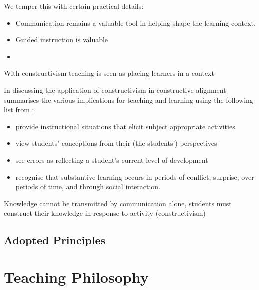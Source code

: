 We temper this with certain practical details:
\begin{itemize}
	\item Communication remains a valuable tool in helping shape the learning context. 
	\item Guided instruction is valuable
	\item 
\end{itemize}


With constructivism teaching is seen as placing learners in a context 







In discussing the application of constructivism in constructive alignment \citet{Biggs:1996c} summarises the various implications for teaching and learning using the following list from \citet{Wood:1995}:
\begin{itemize}
	\item provide instructional situations that elicit subject appropriate activities
	\item view students' conceptions from their (the students') perspectives
	\item see errors as reflecting a student's current level of development
	\item recognise that substantive learning occurs in periods of conflict, surprise, over periods of time, and through social interaction.
\end{itemize}

Knowledge cannot be transmitted by communication alone, students must construct their knowledge in response to activity (constructivism)







\subsection{Adopted Principles} %
\label{sub:adopted_principles}






\section{Teaching Philosophy} %
\label{sec:teaching_philosophy}

